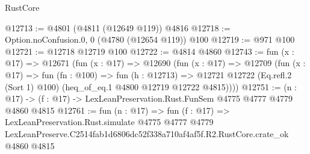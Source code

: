 \begin{lexlean}{RustCore}
\begin{coremodule}
@12713 := @4801 (@4811 (@12649 @119)) @4816
@12718 := Option.noConfusion.{0, 0} (@4780 (@12654 @119)) @100
@12719 := @971 @100
@12721 := @12718 @12719 @100
@12722 := @4814 @4860
@12743 := fun (x : @17) =>
  @12671
    (fun (x : @17) =>
    @12690
      (fun (x : @17) =>
      @12709
        (fun (x : @17) =>
        fun (fn : @100) =>
        fun (h : @12713) =>
        @12721 @12722 (Eq.refl.{2} (Sort 1) @100) (heq_of_eq.{1} @4800 @12719 @12722 @4815))))
@12751 := (n : @17) -> (f : @17) -> LexLeanPreservation.Rust.FunSem @4775 @4777 @4779 @4860 @4815
@12761 := fun (n : @17) =>
  fun (f : @17) =>
  LexLeanPreservation.Rust.simulate
    @4775
    @4777
    @4779
    LexLeanPreserve.C2514fab1d6806dc52f338a710af4af5f.R2.RustCore.crate_ok
    @4860
    @4815
\end{coremodule}
\end{lexlean}
